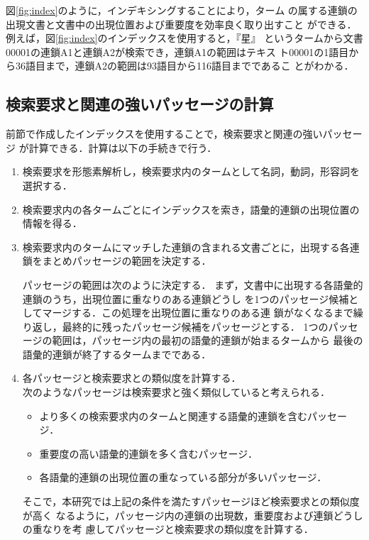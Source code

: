 図\ref{fig:index}のように，インデキシングすることにより，ターム
の属する連鎖の出現文書と文書中の出現位置および重要度を効率良く取り出すこと
ができる．例えば，図\ref{fig:index}のインデックスを使用すると，『星』
というタームから文書00001の連鎖A1と連鎖A2が検索でき，連鎖A1の範囲はテキス
ト00001の1語目から36語目まで，連鎖A2の範囲は93語目から116語目までであるこ
とがわかる．

\subsection{検索要求と関連の強いパッセージの計算}\label{ssec:calcpassage}

前節で作成したインデックスを使用することで，検索要求と関連の強いパッセージ
が計算できる．計算は以下の手続きで行う．

\begin{enumerate}
\item 検索要求を形態素解析し，検索要求内のタームとして名詞，動詞，形容詞を
選択する．
\item 検索要求内の各タームごとにインデックスを索き，語彙的連鎖の出現位置の
	情報を得る．
\item 検索要求内のタームにマッチした連鎖の含まれる文書ごとに，出現する各連
	鎖をまとめパッセージの範囲を決定する．

パッセージの範囲は次のように決定する．
まず，文書中に出現する各語彙的連鎖のうち，出現位置に重なりのある連鎖どうし
を1つのパッセージ候補としてマージする．この処理を出現位置に重なりのある連
鎖がなくなるまで繰り返し，最終的に残ったパッセージ候補をパッセージとする．
1つのパッセージの範囲は，パッセージ内の最初の語彙的連鎖が始まるタームから
最後の語彙的連鎖が終了するタームまでである．

\item 各パッセージと検索要求との類似度を計算する．\\
次のようなパッセージは検索要求と強く類似していると考えられる．
\begin{itemize}
\item より多くの検索要求内のタームと関連する語彙的連鎖を含むパッセージ．
\item 重要度の高い語彙的連鎖を多く含むパッセージ．
\item 各語彙的連鎖の出現位置の重なっている部分が多いパッセージ．
\end{itemize}
そこで，本研究では上記の条件を満たすパッセージほど検索要求との類似度が高く
なるように，パッセージ内の連鎖の出現数，重要度および連鎖どうしの重なりを考
慮してパッセージと検索要求の類似度を計算する．


\end{enumerate}

